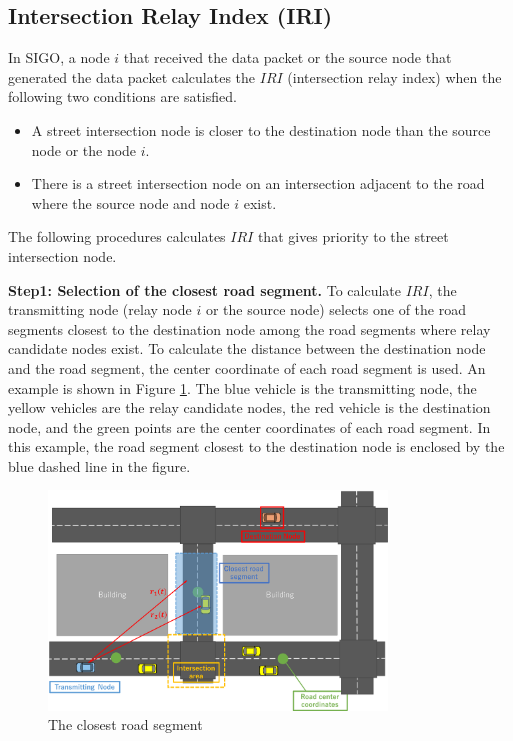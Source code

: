 \documentclass[conference]{IEEEtran}
\begin{document}
\subsection{Intersection Relay Index (IRI)}

In SIGO, a node $i$ that received the data packet or the  source node that generated the data packet calculates the 
$IRI$ (intersection relay index) when the following two conditions are satisfied.
\begin{itemize}
\item A street intersection node is closer to the destination node than the source node or the node $i$.
\item There is a street intersection node on an intersection adjacent to the road where the source node and node $i$ exist.
\end{itemize}

The following procedures calculates $IRI$ that gives priority to  the street intersection node.

\textbf{Step1: Selection of the closest road segment.}
To calculate $IRI$, the transmitting node (relay node $i$ or the source node) selects one of the road segments closest to the destination node among the road segments where relay candidate nodes exist.
To calculate the distance between the destination node and the road segment, the center coordinate of each road segment is used. An example is shown in Figure \ref{fig:closest_road}.
The blue vehicle is the transmitting node, the yellow vehicles are the relay candidate nodes, the red vehicle is the destination node, and the green points are the center coordinates of each road segment. In this example, the road segment closest to the destination node is  enclosed by the blue dashed line in the figure.


\begin{figure}[!ht]
\centering
\includegraphics[width=90mm]{figures/closest_road.eps}
\caption{The closest road segment}
\label{fig:closest_road}
\end{figure}
\end{document}
